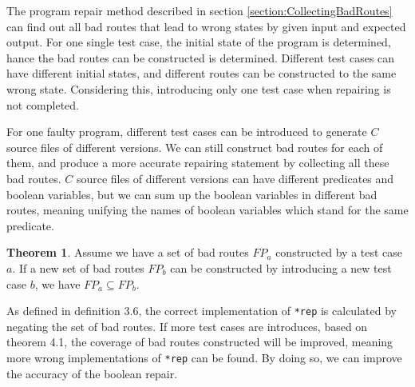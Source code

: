 \documentclass[10pt,journal,final,]{article}
\theoremstyle{definition}
\newtheorem{theorem}{Theorem}[section]
\begin{document}
The program repair method described in section \ref{section:CollectingBadRoutes} can find out all bad routes that lead to wrong states by given input and expected output.
For one single test case, the initial state of the program is determined, hance the bad routes can be constructed is determined.
Different test cases can have different initial states, and different routes can be constructed to the same wrong state.
Considering this, introducing only one test case when repairing is not completed.

For one faulty program, different test cases can be introduced to generate $C$ source files of different versions.
We can still construct bad routes for each of them, and produce a more accurate repairing statement by collecting all these bad routes.
$C$ source files of different versions can have different predicates and boolean variables,
but we can sum up the boolean variables in different bad routes, meaning unifying the names of boolean variables which stand for the same predicate.

\begin{theorem}
Assume we have a set of bad routes $FP_{a}$ constructed by a test case $a$. If a new set of bad routes $FP_{b}$ can be constructed by introducing a new test case $b$,
we have $FP_{a} \subseteq FP_{b}$.
\end{theorem}

As defined in definition 3.6, the correct implementation of \lstinline|*rep| is calculated by negating the set of bad routes. If more test cases are introduces, based on theorem 4.1,
the coverage of bad routes constructed will be improved, meaning more wrong implementations of \lstinline|*rep| can be found. By doing so, we can improve the accuracy of the boolean repair.
\end{document}
